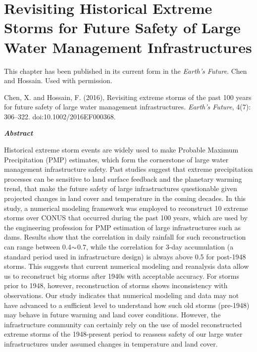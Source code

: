 \chapter {Revisiting Historical Extreme Storms for Future Safety of Large Water Management Infrastructures}
\label{ch:EF}


 
This chapter has been published in its current form in the \textit{Earth's Future}. \textcopyright Chen and Hossain. Used with permission.\\

\bigbreak

\noindent
{}
\setlength{\hangindent}{2em}
Chen, X. and Hossain, F. (2016), Revisiting extreme storms of the past 100 years for future safety of large water management infrastructures. \textit{Earth's Future}, 4(7): 306–322. doi:10.1002/2016EF000368.

\vspace{10mm}

\noindent
\textit{\textbf{Abstract}}
 
Historical extreme storm events are widely used to make Probable Maximum Precipitation (PMP) estimates, which form the cornerstone of large water management infrastructure safety. Past studies suggest that extreme precipitation processes can be sensitive to land surface feedback and the planetary warming trend, that make the future safety of large infrastructures questionable given projected changes in land cover and temperature in the coming decades. In this study, a numerical modeling framework was employed to reconstruct 10 extreme storms over CONUS that occurred during the past 100 years, which are used by the engineering profession for PMP estimation of large infrastructures such as dams. Results show that the correlation in daily rainfall for such reconstruction can range between 0.4$\scriptsize{\sim}$0.7, while the correlation for 3-day accumulation (a standard period used in infrastructure design) is always above 0.5 for post-1948 storms. This suggests that current numerical modeling and reanalysis data allow us to reconstruct big storms after 1940s with acceptable accuracy. For storms prior to 1948, however, reconstruction of storms shows inconsistency with observations. Our study indicates that numerical modeling and data may not have advanced to a sufficient level to understand how such old storms (pre-1948) may behave in future warming and land cover conditions. However, the infrastructure community can certainly rely on the use of model reconstructed extreme storms of the 1948-present period to reassess safety of our large water infrastructures under assumed changes in temperature and land cover.

